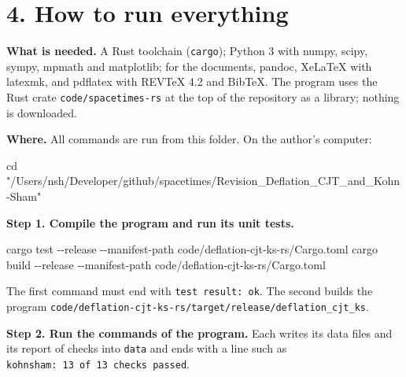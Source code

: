\documentclass[
  10pt,
]{article}
\newenvironment{Shaded}{}{}
\newcommand{\AttributeTok}[1]{\textcolor[rgb]{0.49,0.56,0.16}{#1}}
\newcommand{\BuiltInTok}[1]{\textcolor[rgb]{0.00,0.50,0.00}{#1}}
\newcommand{\ControlFlowTok}[1]{\textcolor[rgb]{0.00,0.44,0.13}{\textbf{#1}}}
\newcommand{\DataTypeTok}[1]{\textcolor[rgb]{0.56,0.13,0.00}{#1}}
\newcommand{\ExtensionTok}[1]{#1}
\newcommand{\KeywordTok}[1]{\textcolor[rgb]{0.00,0.44,0.13}{\textbf{#1}}}
\newcommand{\NormalTok}[1]{#1}
\newcommand{\OperatorTok}[1]{\textcolor[rgb]{0.40,0.40,0.40}{#1}}
\newcommand{\StringTok}[1]{\textcolor[rgb]{0.25,0.44,0.63}{#1}}
\newcommand{\VariableTok}[1]{\textcolor[rgb]{0.10,0.09,0.49}{#1}}
\begin{document}
\hypertarget{how-to-run-everything}{%
\section{4. How to run everything}\label{how-to-run-everything}}

\textbf{What is needed.} A Rust toolchain (\texttt{cargo}); Python 3
with numpy, scipy, sympy, mpmath and matplotlib; for the documents,
pandoc, XeLaTeX with latexmk, and pdflatex with REVTeX 4.2 and BibTeX.
The program uses the Rust crate \texttt{code/spacetimes-rs} at the top
of the repository as a library; nothing is downloaded.

\textbf{Where.} All commands are run from this folder. On the author's
computer:

\begin{Shaded}
\begin{Highlighting}[]
\BuiltInTok{cd} \StringTok{"/Users/nsh/Developer/github/spacetimes/Revision\_Deflation\_CJT\_and\_Kohn{-}Sham"}
\end{Highlighting}
\end{Shaded}

\textbf{Step 1. Compile the program and run its unit tests.}

\begin{Shaded}
\begin{Highlighting}[]
\ExtensionTok{cargo}\NormalTok{ test  }\AttributeTok{{-}{-}release} \AttributeTok{{-}{-}manifest{-}path}\NormalTok{ code/deflation{-}cjt{-}ks{-}rs/Cargo.toml}
\ExtensionTok{cargo}\NormalTok{ build }\AttributeTok{{-}{-}release} \AttributeTok{{-}{-}manifest{-}path}\NormalTok{ code/deflation{-}cjt{-}ks{-}rs/Cargo.toml}
\end{Highlighting}
\end{Shaded}

The first command must end with \texttt{test\ result:\ ok}. The second
builds the program
\texttt{code/deflation-cjt-ks-rs/target/release/deflation\_cjt\_ks}.

\textbf{Step 2. Run the commands of the program.} Each writes its data
files and its report of checks into \texttt{data} and ends with a line
such as \texttt{kohnsham:\ 13\ of\ 13\ checks\ passed}.

\begin{Shaded}
\end{Shaded}
\end{document}

